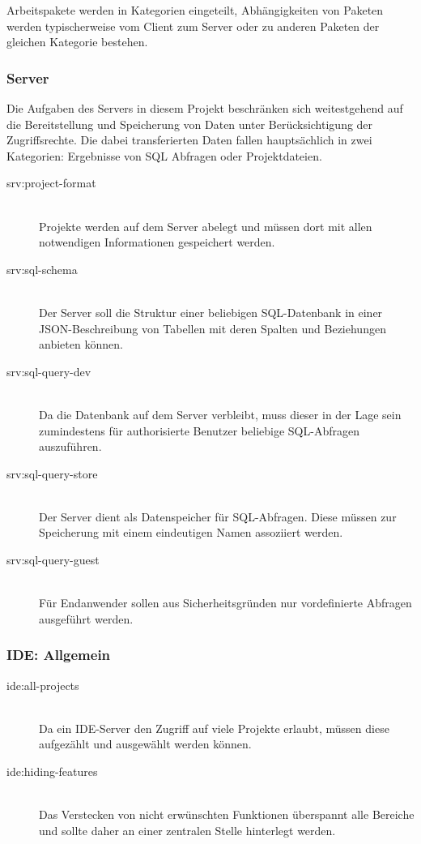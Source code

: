 Arbeitspakete werden in Kategorien eingeteilt, Abhängigkeiten von Paketen werden typischerweise vom Client zum Server oder zu anderen Paketen der gleichen Kategorie bestehen.

\subsubsection{Server}

Die Aufgaben des Servers in diesem Projekt beschränken sich weitestgehend auf die Bereitstellung und Speicherung von Daten unter Berücksichtigung der Zugriffsrechte. Die dabei transferierten Daten fallen hauptsächlich in zwei Kategorien: Ergebnisse von SQL Abfragen oder Projektdateien.

\begin{description}
\item[srv:project-format] \hfill\\
  Projekte werden auf dem Server abelegt und müssen dort mit allen notwendigen Informationen gespeichert werden.
\item[srv:sql-schema] \hfill\\
  Der Server soll die Struktur einer beliebigen SQL-Datenbank in einer JSON-Beschreibung von Tabellen mit deren Spalten und Beziehungen anbieten können.
\item[srv:sql-query-dev] \hfill\\
  Da die Datenbank auf dem Server verbleibt, muss dieser in der Lage sein zumindestens für authorisierte Benutzer beliebige SQL-Abfragen auszuführen.
\item[srv:sql-query-store] \hfill\\
  Der Server dient als Datenspeicher für SQL-Abfragen. Diese müssen zur Speicherung mit einem eindeutigen Namen assoziiert werden.
\item[srv:sql-query-guest] \hfill\\
  Für Endanwender sollen aus Sicherheitsgründen nur vordefinierte Abfragen ausgeführt werden.
\end{description}

\subsubsection{IDE: Allgemein}

\begin{description}
\item[ide:all-projects] \hfill \\
  Da ein IDE-Server den Zugriff auf viele Projekte erlaubt, müssen diese aufgezählt und ausgewählt werden können.
\item[ide:hiding-features] \hfill \\
  Das Verstecken von nicht erwünschten Funktionen überspannt alle Bereiche und sollte daher an einer zentralen Stelle hinterlegt werden.
  
\end{description}

